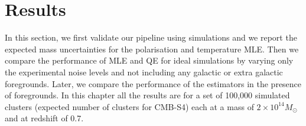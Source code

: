  \section{Results}
\label{sec_mle_results}
 In this section, we first validate our pipeline using simulations and we report the expected mass uncertainties for the polarisation and temperature MLE. 
 Then we compare the performance of MLE and QE for ideal simulations by varying only the experimental noise levels and not including any galactic or extra galactic foregrounds. 
 Later, we compare the performance of the estimators in the presence of foregrounds. 
 In this chapter all the results are for a set of 100,000 simulated clusters (expected number of clusters for CMB-S4) each at a mass of $2\times10^{14} M_{\odot}$ and at redshift of 0.7.

 
